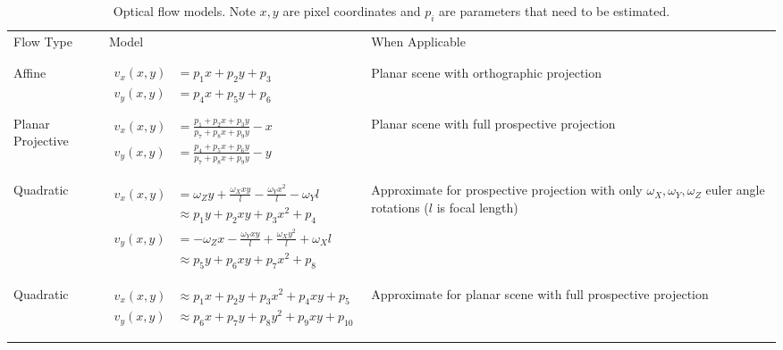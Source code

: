 \begin{table*}
    \begin{center}
        \begin{tabular}{ llp{5cm} }
            Flow Type & Model & When Applicable \\
            \\
            \hline
            \\
            Affine & {$\begin{aligned}
                           v_x(x,y) &= p_1 x + p_2 y + p_3 \\
                           v_y(x,y) &= p_4 x + p_5 y + p_6
            \end{aligned}$} & Planar scene with orthographic projection \\
            \\
            Planar Projective & {$\begin{aligned}
                                      v_x(x,y) &= \frac{p_1+p_2 x + p_3 y}{p_7 + p_8 x + p_9 y} - x\\
                                      v_y(x,y) &= \frac{p_4+p_5 x + p_6 y}{p_7 + p_8 x + p_9 y} - y\\
            \end{aligned}$} & Planar scene with full prospective projection \\
            \\
            Quadratic & {$\begin{aligned}
                              v_x(x,y) &= \omega_Z y + \frac{\omega_X xy}{l} - \frac{\omega_Y x^2}{l} - \omega_Y l \\
                              &\approx p_1 y + p_2 xy + p_3 x^2 + p_4 \\
                              v_y(x,y) &= -\omega_Z x - \frac{\omega_Y xy}{l} + \frac{\omega_X y^2}{l} + \omega_X l \\
                              &\approx p_5 y + p_6 xy + p_7 x^2 + p_8 \\
                              &
            \end{aligned}$} & Approximate for prospective projection with only $\omega_X, \omega_Y, \omega_Z$ euler angle rotations ($l$ is focal length) \\
            \\
            Quadratic & {$\begin{aligned}
                              v_x(x,y) &\approx p_1 x + p_2 y + p_3 x^2 + p_4 xy + p_5 \\
                              v_y(x,y) &\approx p_6 x + p_7 y + p_8 y^2 + p_9 xy + p_{10} \\
                              &
            \end{aligned}$} & Approximate for planar scene with full prospective projection\\
            \\
        \end{tabular}
    \end{center}
    \caption{Optical flow models\cite{Trucco:1998:ITC:551277}. Note $x,y$ are pixel coordinates and $p_i$ are parameters that need to be estimated.}
    \label{table:flow}
\end{table*}
